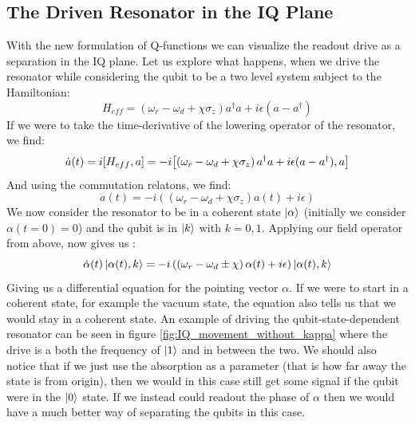 \subsection{The Driven Resonator in the IQ Plane}\label{sec:driving_resonator_iq_plane}
With the new formulation of Q-functions we can visualize the readout drive as a separation in the IQ plane. Let us explore what happens, when we drive the resonator while considering the qubit to be a two level system subject to the Hamiltonian:
\begin{equation}
    H_{eff} =  \left(\omega_r - \omega_d + \chi \sigma_z\right)a^\dagger a + i\epsilon(a - a^\dagger)
\end{equation}
If we were to take the time-derivative of the lowering operator of the resonator, we find:
\begin{equation}
    \dot{a}(t) = i\comm{H_{eff}}{a} = -i\comm{\left(\omega_r - \omega_d + \chi \sigma_z\right)a^\dagger a + i\epsilon(a - a^\dagger)}{a}
\end{equation}
And using the commutation relatons, we find:
\begin{equation}
    \dot{a}(t) = -i \left(\left(\omega_r - \omega_d + \chi \sigma_z\right) a(t) + i\epsilon\right)
\end{equation}
We now consider the resonator to be in a coherent state $\ket{\alpha}$ (initially we consider $\alpha(t=0) = 0$) and the qubit is in $\ket{k}$ with $k = 0,  1$. Applying our field operator from above, now gives us \cite{blais_circuit_2021}:
\begin{equation}\label{eq:resonator_movement}
    \dot{\alpha}(t) \ket{\alpha(t), k} = - i \left(\left(\omega_r - \omega_d \pm \chi \right) \alpha(t) + i\epsilon\right) \ket{\alpha(t), k} 
\end{equation}
Giving us a differential equation for the pointing vector $\alpha$. If we were to start in a coherent state, for example the vacuum state, the equation also tells us that we would stay in a coherent state. An example of driving the qubit-state-dependent resonator can be seen in figure \ref{fig:IQ_movement_without_kappa} where the drive is a both the frequency of $\ket{1}$ and in between the two. We should also notice that if we just use the absorption as a parameter (that is how far away the state is from origin), then we would in this case still get some signal if the qubit were in the $\ket{0}$ state. If we instead could readout the phase of $\alpha$ then we would have a much better way of separating the qubits in this case.

